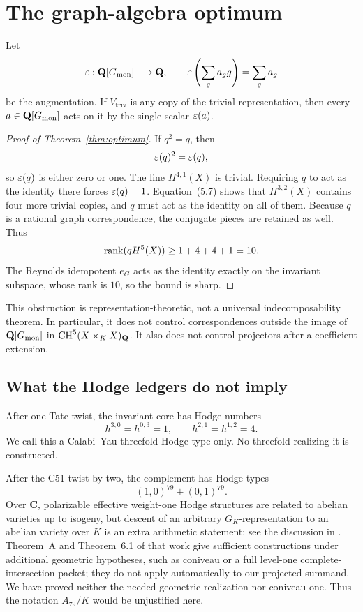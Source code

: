 \section{The graph-algebra optimum}

Let
\[
 \varepsilon:\mathbf Q[G_{\mathrm{mon}}]\longrightarrow\mathbf Q,\qquad
 \varepsilon\left(\sum_ga_gg\right)=\sum_ga_g
\]
be the augmentation.  If \(V_{\mathrm{triv}}\) is any copy of the
trivial representation, then every \(a\in\mathbf Q[G_{\mathrm{mon}}]\) acts on it by the
single scalar \(\varepsilon(a)\).

\begin{proof}[Proof of Theorem~\ref{thm:optimum}]
If \(q^2=q\), then
\[
 \varepsilon(q)^2=\varepsilon(q),
\]
so \(\varepsilon(q)\) is either zero or one.  The line \(H^{4,1}(X)\) is
trivial.  Requiring \(q\) to act as the identity there forces
\(\varepsilon(q)=1\).  Equation~(5.7) shows that \(H^{3,2}(X)\) contains four
more trivial copies, and \(q\) must act as the identity on all of them.
Because \(q\) is a rational graph correspondence, the conjugate pieces
are retained as well.  Thus
\[
 \operatorname{rank}(qH^5(X))\ge1+4+4+1=10.
\]
The Reynolds idempotent \(e_G\) acts as the identity exactly on the
invariant subspace, whose rank is \(10\), so the bound is sharp.
\end{proof}

This obstruction is representation-theoretic, not a universal
indecomposability theorem.  In particular, it does not control
correspondences outside the image of \(\mathbf Q[G_{\mathrm{mon}}]\) in
\(\operatorname{CH}^5(X\times_KX)_{\mathbf Q}\).  It also does not control projectors after a
coefficient extension.

\subsection{What the Hodge ledgers do not imply}

After one Tate twist, the invariant core has Hodge numbers
\[
 h^{3,0}=h^{0,3}=1,\qquad h^{2,1}=h^{1,2}=4.
\]
We call this a Calabi--Yau-threefold Hodge type only.  No threefold
realizing it is constructed.

After the C51 twist by two, the complement has Hodge types
\[
 (1,0)^{79}+(0,1)^{79}.
\]
Over \(\mathbf C\), polarizable effective weight-one Hodge structures
are related to abelian varieties up to isogeny, but descent of an
arbitrary \(G_K\)-representation to an abelian variety over \(K\) is an
extra arithmetic statement; see the discussion in
\cite[Introduction, pp.~2--3]{ACMV2020}.  Theorem~A and
Theorem~6.1 of that work give sufficient constructions under additional
geometric hypotheses, such as coniveau or a full level-one
complete-intersection packet; they do not apply automatically to our
projected summand.  We have proved neither the needed geometric
realization nor coniveau one.  Thus the notation \(A_{79}/K\) would be
unjustified here.
